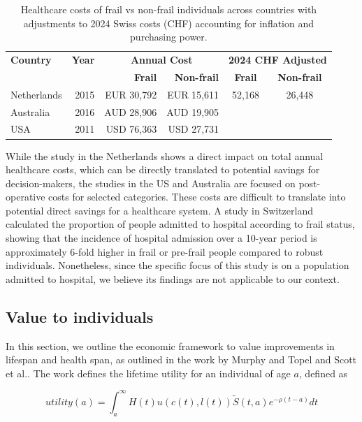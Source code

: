 \begin{table}[h]
\centering
\small
\setlength{\tabcolsep}{3pt}
\begin{tabular}{lrrrcc}
\toprule
\textbf{Country} & \textbf{Year} & \multicolumn{2}{c}{\textbf{Annual Cost}} & \multicolumn{2}{c}{\textbf{2024 CHF Adjusted}} \\
\cmidrule(lr){3-4}\cmidrule(lr){5-6}
 & & \textbf{Frail} & \textbf{Non-frail} & \textbf{Frail} & \textbf{Non-frail} \\
\midrule
Netherlands & 2015 & EUR 30,792 & EUR 15,611 & 52,168 & 26,448 \\
Australia & 2016 & AUD 28,906 & AUD 19,905 & & \\
USA & 2011 & USD 76,363 & USD 27,731 & & \\
\bottomrule
\end{tabular}
\caption{Healthcare costs of frail vs non-frail individuals across countries with adjustments to 2024 Swiss costs (CHF) accounting for inflation and purchasing power.}
\label{tab:costs}
\end{table}

While the study in the Netherlands shows a direct impact on total annual healthcare costs, which can be directly translated to potential savings for decision-makers, the studies in the US and Australia are focused on post-operative costs for selected categories. These costs are difficult to translate into potential direct savings for a healthcare system. A study in Switzerland calculated the proportion of people admitted to hospital according to frail status, showing that the incidence of hospital admission over a 10-year period is approximately 6-fold higher in frail or pre-frail people compared to robust individuals\cite{Luini2023}. Nonetheless, since the specific focus of this study is on a population admitted to hospital, we believe its findings are not applicable to our context.

\subsection{Value to individuals}

In this section, we outline the economic framework to value improvements in lifespan and health span, as outlined in the work by Murphy and Topel\cite{Murphy2006} and Scott et al.\cite{Scott2023a,Scott2023b}. The work defines the lifetime utility for an individual of age $a$, defined as

\begin{equation}\label{eq:lifetime_utility}
utility(a) = \int_{a}^{\infty}{H(t)u\left( c(t),l(t) \right)\widetilde{S}}(t,a)e^{- \rho(t - a)}dt
\end{equation}

